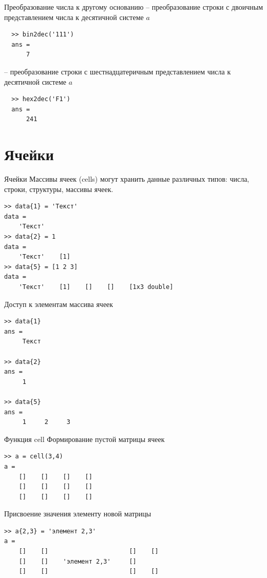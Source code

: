 \documentclass[11pt, compress]{beamer}
\begin{document}
\begin{frame}[fragile]{Преобразование числа к другому основанию}  
 -- преобразование строки с двоичным представлением числа к десятичной системе $a$
  \begin{lstlisting}
  >> bin2dec('111')
  ans =
      7
  \end{lstlisting}
   -- преобразование строки с шестнадцатеричным представлением числа к десятичной системе $a$
  \begin{lstlisting}    
  >> hex2dec('F1')
  ans =
      241    
  \end{lstlisting}
\end{frame}

\section{Ячейки}

\begin{frame}[containsverbatim]{Ячейки}
  Массивы ячеек (cells) могут хранить данные различных типов: числа, строки, структуры, массивы ячеек.
\begin{lstlisting}[frame=single]   
>> data{1} = 'Текст'
data = 
    'Текст'
>> data{2} = 1
data = 
    'Текст'    [1]
>> data{5} = [1 2 3]
data = 
    'Текст'    [1]    []    []    [1x3 double]
\end{lstlisting}
\end{frame}

\begin{frame}[containsverbatim]{Доступ к элементам массива ячеек}
\begin{lstlisting}[frame=single]   
>> data{1}
ans =
     Текст

>> data{2}
ans =
     1

>> data{5}
ans =
     1     2     3
\end{lstlisting}
\end{frame}

\begin{frame}[containsverbatim]{Функция cell}
Формирование пустой матрицы ячеек
\begin{lstlisting}
>> a = cell(3,4)
a = 
    []    []    []    []
    []    []    []    []
    []    []    []    []
\end{lstlisting}    
Присвоение значения элементу новой матрицы 
\begin{lstlisting}
>> a{2,3} = 'элемент 2,3'
a = 
    []    []                      []    []
    []    []    'элемент 2,3'     []
    []    []                      []    []
\end{lstlisting}
\end{frame}
\end{document}
